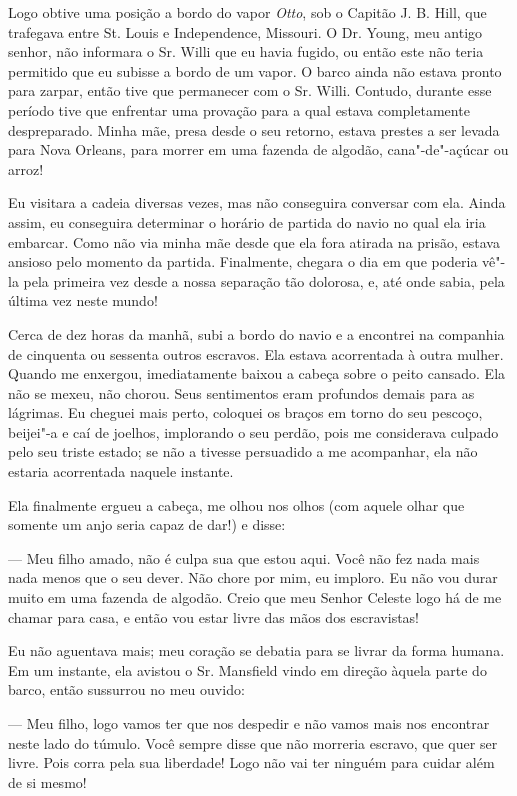 Logo obtive uma posição a bordo do vapor \emph{Otto}, sob o Capitão J.
B. Hill, que trafegava entre St. Louis e Independence, Missouri. O Dr.
Young, meu antigo senhor, não informara o Sr. Willi que eu havia fugido,
ou então este não teria permitido que eu subisse a bordo de um vapor. O
barco ainda não estava pronto para zarpar, então tive que permanecer com
o Sr. Willi. Contudo, durante esse período tive que enfrentar uma
provação para a qual estava completamente despreparado. Minha mãe, presa
desde o seu retorno, estava prestes a ser levada para Nova Orleans, para
morrer em uma fazenda de algodão, cana"-de"-açúcar ou arroz!

Eu visitara a cadeia diversas vezes, mas não conseguira conversar com
ela. Ainda assim, eu conseguira determinar o horário de partida do navio
no qual ela iria embarcar. Como não via minha mãe desde que ela fora
atirada na prisão, estava ansioso pelo momento da partida. Finalmente,
chegara o dia em que poderia vê"-la pela primeira vez desde a nossa
separação tão dolorosa, e, até onde sabia, pela última vez neste mundo!

Cerca de dez horas da manhã, subi a bordo do navio e a encontrei na
companhia de cinquenta ou sessenta outros escravos. Ela estava
acorrentada à outra mulher. Quando me enxergou, imediatamente baixou a
cabeça sobre o peito cansado. Ela não se mexeu, não chorou. Seus
sentimentos eram profundos demais para as lágrimas. Eu cheguei mais
perto, coloquei os braços em torno do seu pescoço, beijei"-a e caí de
joelhos, implorando o seu perdão, pois me considerava culpado pelo seu
triste estado; se não a tivesse persuadido a me acompanhar, ela não
estaria acorrentada naquele instante.

Ela finalmente ergueu a cabeça, me olhou nos olhos (com aquele olhar que
somente um anjo seria capaz de dar!) e disse:

--- Meu filho amado, não é culpa sua que estou aqui. Você não fez nada
mais nada menos que o seu dever. Não chore por mim, eu imploro. Eu não
vou durar muito em uma fazenda de algodão. Creio que meu Senhor Celeste
logo há de me chamar para casa, e então vou estar livre das mãos dos
escravistas!

Eu não aguentava mais; meu coração se debatia para se livrar da forma
humana. Em um instante, ela avistou o Sr. Mansfield vindo em direção
àquela parte do barco, então sussurrou no meu ouvido:

--- Meu filho, logo vamos ter que nos despedir e não vamos mais nos
encontrar neste lado do túmulo. Você sempre disse que não morreria
escravo, que quer ser livre. Pois corra pela sua liberdade! Logo não vai
ter ninguém para cuidar além de si mesmo!

